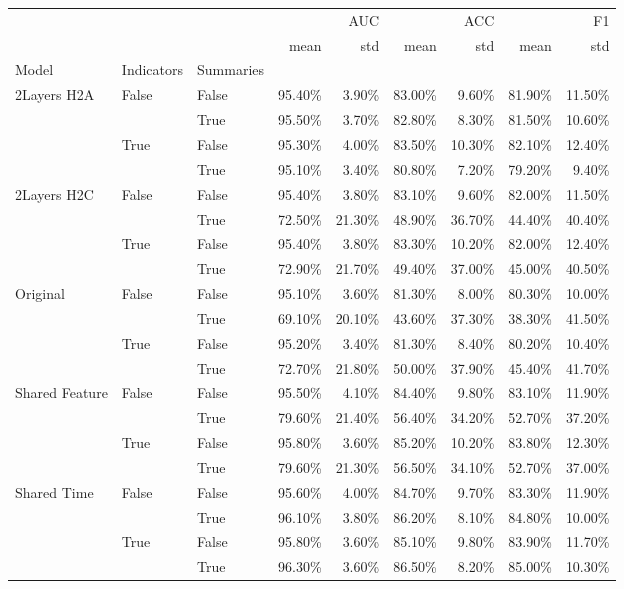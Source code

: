\begin{tabular}{lllrrrrrr}
\toprule
 &  &  & \multicolumn{2}{r}{AUC} & \multicolumn{2}{r}{ACC} & \multicolumn{2}{r}{F1} \\
 &  &  & mean & std & mean & std & mean & std \\
Model & Indicators & Summaries &  &  &  &  &  &  \\
\midrule
\multirow[t]{4}{*}{2Layers H2A} & \multirow[t]{2}{*}{False} & False & 95.40\% & 3.90\% & 83.00\% & 9.60\% & 81.90\% & 11.50\% \\
 &  & True & 95.50\% & 3.70\% & 82.80\% & 8.30\% & 81.50\% & 10.60\% \\
\cline{2-9}
 & \multirow[t]{2}{*}{True} & False & 95.30\% & 4.00\% & 83.50\% & 10.30\% & 82.10\% & 12.40\% \\
 &  & True & 95.10\% & 3.40\% & 80.80\% & 7.20\% & 79.20\% & 9.40\% \\
\cline{1-9} \cline{2-9}
\multirow[t]{4}{*}{2Layers H2C} & \multirow[t]{2}{*}{False} & False & 95.40\% & 3.80\% & 83.10\% & 9.60\% & 82.00\% & 11.50\% \\
 &  & True & 72.50\% & 21.30\% & 48.90\% & 36.70\% & 44.40\% & 40.40\% \\
\cline{2-9}
 & \multirow[t]{2}{*}{True} & False & 95.40\% & 3.80\% & 83.30\% & 10.20\% & 82.00\% & 12.40\% \\
 &  & True & 72.90\% & 21.70\% & 49.40\% & 37.00\% & 45.00\% & 40.50\% \\
\cline{1-9} \cline{2-9}
\multirow[t]{4}{*}{Original} & \multirow[t]{2}{*}{False} & False & 95.10\% & 3.60\% & 81.30\% & 8.00\% & 80.30\% & 10.00\% \\
 &  & True & 69.10\% & 20.10\% & 43.60\% & 37.30\% & 38.30\% & 41.50\% \\
\cline{2-9}
 & \multirow[t]{2}{*}{True} & False & 95.20\% & 3.40\% & 81.30\% & 8.40\% & 80.20\% & 10.40\% \\
 &  & True & 72.70\% & 21.80\% & 50.00\% & 37.90\% & 45.40\% & 41.70\% \\
\cline{1-9} \cline{2-9}
\multirow[t]{4}{*}{Shared Feature} & \multirow[t]{2}{*}{False} & False & 95.50\% & 4.10\% & 84.40\% & 9.80\% & 83.10\% & 11.90\% \\
 &  & True & 79.60\% & 21.40\% & 56.40\% & 34.20\% & 52.70\% & 37.20\% \\
\cline{2-9}
 & \multirow[t]{2}{*}{True} & False & 95.80\% & 3.60\% & 85.20\% & 10.20\% & 83.80\% & 12.30\% \\
 &  & True & 79.60\% & 21.30\% & 56.50\% & 34.10\% & 52.70\% & 37.00\% \\
\cline{1-9} \cline{2-9}
\multirow[t]{4}{*}{Shared Time} & \multirow[t]{2}{*}{False} & False & 95.60\% & 4.00\% & 84.70\% & 9.70\% & 83.30\% & 11.90\% \\
 &  & True & 96.10\% & 3.80\% & 86.20\% & 8.10\% & 84.80\% & 10.00\% \\
\cline{2-9}
 & \multirow[t]{2}{*}{True} & False & 95.80\% & 3.60\% & 85.10\% & 9.80\% & 83.90\% & 11.70\% \\
 &  & True & 96.30\% & 3.60\% & 86.50\% & 8.20\% & 85.00\% & 10.30\% \\
\cline{1-9} \cline{2-9}
\bottomrule
\end{tabular}
